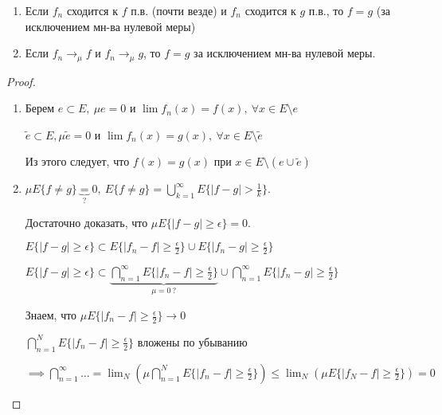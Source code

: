 \begin{statement}
    \begin{enumerate}
        \item {
            Если $f_n$ сходится к $f$ п.в. (почти везде) и $f_n$ сходится к $g$ п.в., то $f = g$ (за исключением мн-ва нулевой меры)
        }
        \item {
            Если $f_n \rightarrow_{\mu} f$ и $f_n \rightarrow_{\mu} g$, то $f = g$ за исключением мн-ва нулевой меры.
        }
    \end{enumerate}
\end{statement}
\begin{proof}
    \begin{enumerate}
        \item {
            Берем $e \subset E, \ \mu e = 0$ и $\lim{f_n(x)} = f(x), \ \forall x \in E \setminus e$

            $\tilde{e} \subset E, \mu \tilde{e} = 0$ и $\lim{f_n(x)} = g(x), \ \forall x \in E \setminus \tilde{e}$
        
            Из этого следует, что $f(x) = g(x)$ при $x \in E \setminus (e \cup \tilde{e})$
        }
        \item {
            $\mu E \{ f \not = g \} \underbrace{=}_{?} 0, \ E\{ f \not = g \} = \bigcup_{k=1}^{\infty} E \{ |f - g| > \frac{1}{k} \}$.

            Достаточно доказать, что $\mu E \{ |f - g| \geq \epsilon \} = 0$.

            $E \{ |f - g| \geq \epsilon \} \subset E \{ |f_n - f| \geq \frac{\epsilon}{2} \} \cup E \{ |f_n - g| \geq \frac{\epsilon}{2} \}$


            $E \{ |f - g| \geq \epsilon \} \subset \underbrace{\bigcap_{n=1}^{\infty} E \{ |f_n - f| \geq \frac{\epsilon}{2} \}}_{\mu = 0 \ ?} \cup \bigcap_{n=1}^{\infty} E \{ |f_n - g| \geq \frac{\epsilon}{2} \}$

            Знаем, что $\mu E \{ |f_n - f| \geq \frac{\epsilon}{2} \} \rightarrow 0$

            $\bigcap_{n=1}^{N} E \{ |f_n - f| \geq \frac{\epsilon}{2} \}$ вложены по убыванию

            $\implies \bigcap_{n=1}^{\infty} \dots = \lim_{N} \left( { \mu \bigcap_{n=1}^{N} E \{ |f_n - f| \geq \frac{\epsilon}{2} \} } \right) \leq \lim_{N} \left( {\mu E \{ |f_N - f| \geq \frac{\epsilon}{2} \}}\right) = 0$
        }
    \end{enumerate}
\end{proof}

